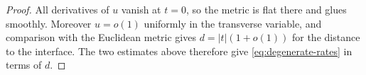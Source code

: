\documentclass[10pt,a4paper]{amsart}
\newcommand{\abs}[1]{\lvert #1\rvert}
\begin{document}
\begin{proof}
All derivatives of $u$ vanish at $t=0$, so the metric is flat there and glues smoothly.  Moreover $u=o(1)$ uniformly in the transverse variable, and comparison with the Euclidean metric gives $d=\abs t(1+o(1))$ for the distance to the interface.  The two estimates above therefore give \eqref{eq:degenerate-rates} in terms of $d$.

\end{proof}
\end{document}
